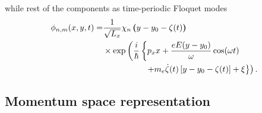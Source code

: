 \documentclass[
 reprint,
 amsmath,amssymb,
 aps,
 prb,
]{revtex4-2}
\begin{document}
while rest of the components as time-periodic Floquet modes
\begin{equation} \label{eq:b7}
  \begin{aligned}
    \phi_{n,m}(x,y,t) =  &
    \frac{1}{\sqrt{L_x}} \chi_n\bm{\left(}y - y_0 - \zeta(t)\bm{\right)} \\
    & \times
    \exp \left(
       \frac{i}{\hbar}
       \left\{
       p_x x +
       \frac{eE(y-y_0)}{\omega}\cos(\omega t)  \right. \right. \\
    & \left. \left. \qquad\qquad\quad
    + m_e\dot{\zeta}(t) \left[ y-y_0 -\zeta(t) \right]
    + \xi \right\}
     \right).
  \end{aligned}
\end{equation}

\subsection{Momentum space representation}
\end{document}
